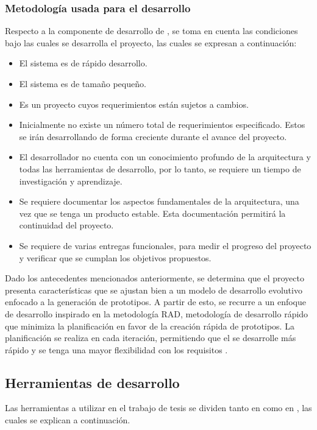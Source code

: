 \subsubsection*{Metodología usada para el desarrollo}
Respecto a la componente de desarrollo de , se toma en cuenta las condiciones bajo las cuales se desarrolla el proyecto, las cuales se expresan a continuación:

\begin{itemize}
	\item El sistema es de rápido desarrollo.
	\item El sistema es de tamaño pequeño.
	\item Es un proyecto cuyos requerimientos están sujetos a cambios.
	\item Inicialmente no existe un número total de requerimientos especificado. Estos se irán desarrollando de forma creciente durante el avance del proyecto.
	\item El desarrollador no cuenta con un conocimiento profundo de la arquitectura y todas las herramientas de desarrollo, por lo tanto, se requiere un tiempo de investigación y aprendizaje.   
	\item Se requiere documentar los aspectos fundamentales de la arquitectura, una vez que se tenga un producto estable. Esta documentación permitirá la continuidad del proyecto. 
	\item Se requiere de varias entregas funcionales, para medir el progreso del proyecto y verificar que se cumplan los objetivos propuestos.
\end{itemize}

Dado los antecedentes mencionados anteriormente, se determina que el proyecto presenta características que se ajustan bien a un modelo de desarrollo evolutivo enfocado a la generación de prototipos. A partir de esto, se recurre a un enfoque de desarrollo inspirado en la metodología RAD, metodología de desarrollo rápido que minimiza la planificación en favor de la creación rápida de prototipos. La planificación se realiza en cada iteración, permitiendo que el  se desarrolle más rápido y se tenga una mayor flexibilidad con los requisitos \parencite{mcconnell1996rapid}.

\subsection{Herramientas de desarrollo}
\label{subsec:herramientas}
Las herramientas a utilizar en el trabajo de tesis se dividen tanto en  como en , las cuales se explican a continuación.

